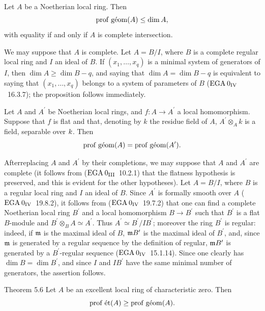 \begin{proposition} \label{XIV.5.4} Let $A$ be a Noetherian local ring. Then
$$
\profgeom(A)\leq\dim A,
$$
with equality if and only if $A$ is  complete intersection.
\end{proposition}

We may suppose that $A$ is complete. Let $A=B/I$, where $B$ is a complete regular local ring and $I$ an ideal of $B$. If $(x_{1},\dots, x_{q})$ is a minimal system of generators of $I$, then $\dim A\geq\dim B-q$, and saying that $\dim A=\dim B-q$ is equivalent to saying that $(x_{1},\dots, x_{q})$ belongs to a system of parameters of $B$ ($\EGA 0_{\textup{IV}}$~16.3.7); the proposition follows immediately.

\begin{proposition} \label{XIV.5.5} Let $A$ and $A^{\prime}$ be Noetherian local rings, and $f\colon A\to A^{\prime}$ a local homomorphism. Suppose that $f$ is flat and that, denoting by $k$ the residue field of $A$, $A^{\prime}\otimes_{A}k$ is a field, separable over $\sisi{K}{k}$. Then
$$
\profgeom(A)=\profgeom(A^{\prime}).
$$
\end{proposition}

After\pageoriginale replacing $A$ and $A^{\prime}$ by their completions, we may suppose that $A$ and $A^{\prime}$ are complete (it follows from ($\EGA 0_{\textup{III}}$~10.2.1) that the flatness hypothesis is preserved, and this is evident for the other hypotheses). Let $A=B/I$, where $B$ is a regular local ring and $I$ an ideal of $B$. Since $A^{\prime}$ is formally smooth over $A$ ($\EGA 0_{\textup{IV}}$~19.8.2), it follows from ($\EGA 0_{\textup{IV}}$~19.7.2) that one can find a complete Noetherian local ring $B^{\prime}$ and a local homomorphism $B\to B^{\prime}$ such that $B^{\prime}$ is a flat $B$-module and $B^{\prime}\otimes_{B}A\simeq A^{\prime}$. Thus $A^{\prime}\simeq B^{\prime}/IB^{\prime}$; moreover the ring $B^{\prime}$ is regular: indeed, if $\mm$ is the maximal ideal of $B$, $\mm B^{\prime}$ is the maximal ideal of $B^{\prime}$, and, since $\mm$ is generated by a regular sequence by the definition of \og regular\fg, $\sisi{B^{\prime}}{\mm B^{\prime}}$ is generated by a $B^{\prime}$-regular sequence ($\EGA 0_{\textup{IV}}$~15.1.14). Since one clearly has $\dim B=\dim B^{\prime}$, and since $I$ and $IB^{\prime}$ have the same minimal number of generators, the assertion follows.

\label{XIV.5.6}
\begin{enonce*}{Theorem 5.6\ndemark}
Let $A$ be an excellent local ring of characteristic zero. Then
$$
\profet(A)\geq\profgeom(A).
$$
\end{enonce*}

